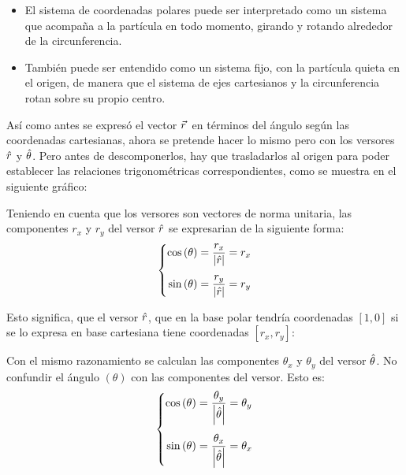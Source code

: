 \begin{center}
    \def\svgwidth{0.7\linewidth}
    
\end{center}

\begin{itemize}
  \item El sistema de coordenadas polares puede ser interpretado como un sistema que acompaña a la partícula en todo momento, girando y rotando alrededor de la circunferencia.
  \item También puede ser entendido como un sistema fijo, con la partícula quieta en el origen, de manera que el sistema de ejes cartesianos y la circunferencia rotan sobre su propio centro.
\end{itemize}

Así como antes se expresó el vector $\vec{r}\hspace{0.05cm}$ en términos del ángulo según las coordenadas cartesianas, ahora se pretende hacer lo mismo pero con los versores $\hat{r}$ y $\hat{\theta}$.
Pero antes de descomponerlos, hay que trasladarlos al origen para poder establecer las relaciones trigonométricas correspondientes, como se muestra en el siguiente gráfico:

\begin{center}
    \def\svgwidth{0.5\linewidth}
    
\end{center}

Teniendo en cuenta que los versores son vectores de norma unitaria, las componentes $r_x$ y $r_y$ del versor $\hat{r}$ se expresarian de la siguiente forma:
\[
  \left\{
    \begin{aligned}
      \cos{(\theta)} &= \dfrac{r_x}{{\left| {\hat{r}} \right|}} = r_x
      \\[1ex]
      \sin{(\theta)} &= \dfrac{r_y}{{\left| {\hat{r}} \right|}} = r_y
    \end{aligned}
  \right.
\]

Esto significa, que el versor $\hat{r}$, que en la base polar tendría coordenadas $[1,0]$ si se lo expresa en base cartesiana tiene coordenadas $[r_x,r_y]$:

Con el mismo razonamiento se calculan las componentes $\theta_x$ y $\theta_y$ del versor $\hat{\theta}$.
No confundir el ángulo $(\theta)$ con las componentes del versor.
Esto es:
\[
\left\{
  \begin{aligned}
    \cos{(\theta)} &= \dfrac{\theta_y}{{\left| {\hat{\theta}} \right|}} = \theta_y
    \\[1ex]
    \sin{(\theta)} &= \dfrac{\theta_x}{{\left| {\hat{\theta}} \right|}} = \theta_x
  \end{aligned}
\right.
\]

